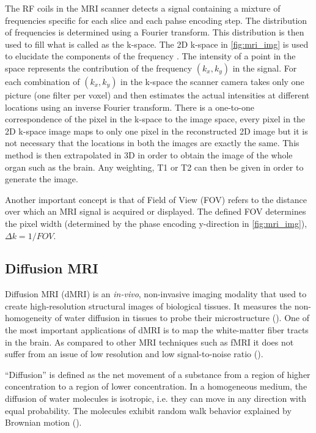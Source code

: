 \documentclass[msthesis.tex]{subfiles}
\begin{document}
The RF coils in the MRI scanner detects a signal containing a mixture of frequencies specific for each slice and each pahse encoding step. The distribution of frequencies is determined using a Fourier transform. This distribution is then used to fill what is called as the k-space. The 2D k-space in \autoref{fig:mri_img} is used to elucidate the components of the frequency . The intensity of a point in the space represents the contribution of the frequency $(k_x,k_y)$ in the signal. For each combination of $(k_x, k_y)$ in the k-space the scanner camera takes only one picture (one filter per voxel) and then estimates the actual intensities at different locations using an inverse Fourier transform. There is a one-to-one correspondence of the pixel in the k-space to the image space, every pixel in the 2D k-space image maps to only one pixel in the reconstructed 2D image but it is not necessary that the locations in both the images are exactly the same. This method is then extrapolated in 3D in order to obtain the image of the whole organ such as the brain. Any weighting, T1 or T2 can then be given in order to generate the image.

Another important concept is that of Field of View (FOV) refers to the distance over which an MRI signal is acquired or displayed. The defined FOV determines the pixel width (determined by the phase encoding y-direction in \autoref{fig:mri_img}), $\Delta k = 1/FOV$. 



\subsection{Diffusion MRI}

Diffusion MRI (dMRI) is an \textit{in-vivo}, non-invasive imaging modality that used to create high-resolution structural images of biological tissues. It measures the non-homogeneity of water diffusion in tissues to probe their microstructure (\cite{ghosh2015survey}). One of the most important applications of dMRI is to map the white-matter fiber tracts in the brain. As compared to other MRI techniques such as fMRI it does not suffer from an issue of low resolution and low signal-to-noise ratio (\cite{wong2016}). 

“Diffusion” is defined as the net movement of a substance from a region of higher concentration to a region of lower concentration. In a homogeneous medium, the diffusion of water molecules is isotropic, i.e. they can move in any direction with equal probability. The molecules exhibit random walk behavior explained by Brownian motion (\cite{Brogioli_2000}).
\end{document}
